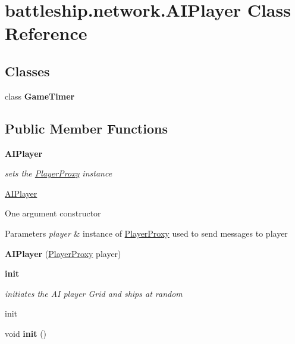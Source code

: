 \hypertarget{classbattleship_1_1network_1_1AIPlayer}{}\section{battleship.\+network.\+A\+I\+Player Class Reference}
\label{classbattleship_1_1network_1_1AIPlayer}
\subsection*{Classes}
\begin{DoxyCompactItemize}
\item 
class {\bfseries Game\+Timer}
\end{DoxyCompactItemize}
\subsection*{Public Member Functions}
\begin{Indent}{\bf A\+I\+Player}\par
{\em sets the \hyperlink{classbattleship_1_1network_1_1PlayerProxy}{Player\+Proxy} instance

\hyperlink{classbattleship_1_1network_1_1AIPlayer}{A\+I\+Player}

One argument constructor 
\begin{DoxyParams}{Parameters}
{\em player} & instance of \hyperlink{classbattleship_1_1network_1_1PlayerProxy}{Player\+Proxy} used to send messages to player \\
\hline
\end{DoxyParams}
}\begin{DoxyCompactItemize}
\item 
\hypertarget{classbattleship_1_1network_1_1AIPlayer_a2f357b9bcb42d6691bf93a2459257d30}{}{\bfseries A\+I\+Player} (\hyperlink{classbattleship_1_1network_1_1PlayerProxy}{Player\+Proxy} player)\label{classbattleship_1_1network_1_1AIPlayer_a2f357b9bcb42d6691bf93a2459257d30}

\end{DoxyCompactItemize}
\end{Indent}
\begin{Indent}{\bf init}\par
{\em initiates the A\+I player Grid and ships at random

init }\begin{DoxyCompactItemize}
\item 
\hypertarget{classbattleship_1_1network_1_1AIPlayer_a8529d0c45bbf466c528176252e166c7e}{}void {\bfseries init} ()\label{classbattleship_1_1network_1_1AIPlayer_a8529d0c45bbf466c528176252e166c7e}

\end{DoxyCompactItemize}
\end{Indent}
